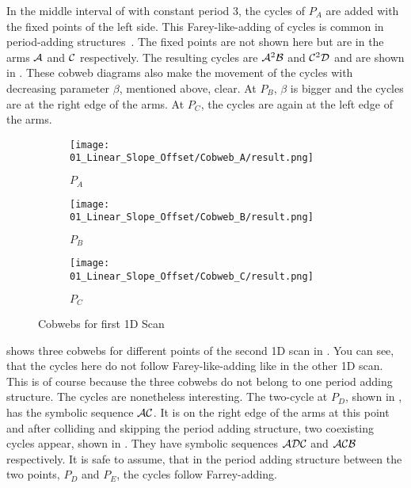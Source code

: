 In the middle interval of  with constant period 3, the cycles of $P_A$ are added with the fixed points of the left side.
This Farey-like-adding of cycles is common in period-adding structures~\cite{avrutin2019continuous}.
The fixed points are not shown here but are in the arms $\mathcal{A}$ and $\mathcal{C}$ respectively.
The resulting cycles are $\mathcal{A}^2\mathcal{B}$ and $\mathcal{C}^2\mathcal{D}$ and are shown in .
These cobweb diagrams also make the movement of the cycles with decreasing parameter $\beta$, mentioned above, clear.
At $P_B$, $\beta$ is bigger and the cycles are at the right edge of the arms.
At $P_C$, the cycles are again at the left edge of the arms.

\begin{figure}
    \centering
    \begin{subfigure}{0.3\textwidth}
        \centering
        \texttt{[image: 01\_Linear\_Slope\_Offset/Cobweb\_A/result.png]}
        \caption{$P_A$}
        \label{fig:pcw.lin.CobwebA}
    \end{subfigure}
    \begin{subfigure}{0.3\textwidth}
        \centering
        \texttt{[image: 01\_Linear\_Slope\_Offset/Cobweb\_B/result.png]}
        \caption{$P_B$}
        \label{fig:pcw.lin.CobwebB}
    \end{subfigure}
    \begin{subfigure}{0.3\textwidth}
        \centering
        \texttt{[image: 01\_Linear\_Slope\_Offset/Cobweb\_C/result.png]}
        \caption{$P_C$}
        \label{fig:pcw.lin.CobwebC}
    \end{subfigure}
    \caption{Cobwebs for first 1D Scan}
    \label{fig:pcw.lin.CobwebA-C}
\end{figure}

 shows three cobwebs for different points of the second 1D scan in .
You can see, that the cycles here do not follow Farey-like-adding like in the other 1D scan.
This is of course because the three cobwebs do not belong to one period adding structure.
The cycles are nonetheless interesting.
The two-cycle at $P_D$, shown in , has the symbolic sequence $\mathcal{A}\mathcal{C}$.
It is on the right edge of the arms at this point and after colliding and skipping the period adding structure, two coexisting cycles appear, shown in .
They have symbolic sequences $\mathcal{A}\mathcal{D}\mathcal{C}$ and $\mathcal{A}\mathcal{C}\mathcal{B}$ respectively.
It is safe to assume, that in the period adding structure between the two points, $P_D$ and $P_E$, the cycles follow Farrey-adding.

